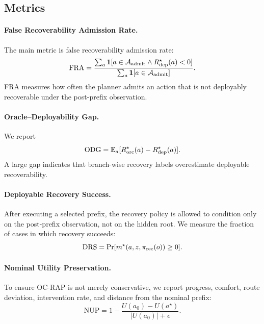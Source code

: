 \documentclass[conference]{IEEEtran}
\begin{document}
\subsection{Metrics}
\label{subsec:metrics}

\paragraph{False Recoverability Admission Rate.}
The main metric is false recoverability admission rate:
\begin{equation}
    \mathrm{FRA}
    =
    \frac{
        \sum_{a}
        \mathbf{1}
        [
            a \in \mathcal{A}_{\rm admit}
            \wedge
            R_{\rm dep}^{\star}(a)<0
        ]
    }{
        \sum_{a}
        \mathbf{1}
        [
            a \in \mathcal{A}_{\rm admit}
        ]
    }.
    \label{eq:fra}
\end{equation}
FRA measures how often the planner admits an action that is not deployably recoverable under the post-prefix observation.

\paragraph{Oracle--Deployability Gap.}
We report
\begin{equation}
    \mathrm{ODG}
    =
    \mathbb{E}_{a}
    [
        R_{\rm orc}^{\star}(a)
        -
        R_{\rm dep}^{\star}(a)
    ].
    \label{eq:odg}
\end{equation}
A large gap indicates that branch-wise recovery labels overestimate deployable recoverability.

\paragraph{Deployable Recovery Success.}
After executing a selected prefix, the recovery policy is allowed to condition only on the post-prefix observation, not on the hidden root.  We measure the fraction of cases in which recovery succeeds:
\begin{equation}
    \mathrm{DRS}
    =
    \Pr[
        m^\star(a,z,\pi_{\rm rec}(o))\geq 0
    ].
    \label{eq:drs}
\end{equation}

\paragraph{Nominal Utility Preservation.}
To ensure OC-RAP is not merely conservative, we report progress, comfort, route deviation, intervention rate, and distance from the nominal prefix:
\begin{equation}
    \mathrm{NUP}
    =
    1 -
    \frac{
        U(a_0)-U(a^\star)
    }{
        |U(a_0)|+\epsilon
    }.
    \label{eq:nup}
\end{equation}
\end{document}
